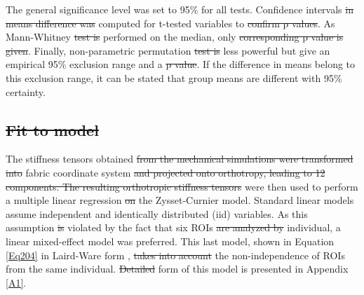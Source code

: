\documentclass[a4paper,fleqn]{DC_ArtStyle}
\providecommand{\DIFadd}[1]{{\protect\color{blue}{#1}}} %
\providecommand{\DIFdel}[1]{{\protect\color{red}\sout{#1}}}                      %
\providecommand{\DIFaddbegin}{} %
\providecommand{\DIFaddend}{} %
\providecommand{\DIFdelbegin}{} %
\providecommand{\DIFdelend}{} %
\begin{document}
\DIFdelend The general significance level was set to 95\% for all tests. Confidence intervals \DIFdelbegin \DIFdel{in means difference was }\DIFdelend \DIFaddbegin \DIFadd{were }\DIFaddend computed for t-tested variables to \DIFdelbegin \DIFdel{confirm p values}\DIFdelend \DIFaddbegin \DIFadd{quantify the difference in both groups means}\DIFaddend . As Mann-Whitney \DIFdelbegin \DIFdel{test is }\DIFdelend \DIFaddbegin \DIFadd{tests are }\DIFaddend performed on the median, only \DIFdelbegin \DIFdel{corresponding p value is given}\DIFdelend \DIFaddbegin \DIFadd{the corresponding p-value is presented}\DIFaddend . Finally, non-parametric permutation \DIFdelbegin \DIFdel{test is }\DIFdelend \DIFaddbegin \DIFadd{tests are }\DIFaddend less powerful but give an empirical 95\% exclusion range and a \DIFdelbegin \DIFdel{p value}\DIFdelend \DIFaddbegin \DIFadd{p-value}\DIFaddend . If the difference in means belong to this exclusion range, it can be stated that group means are different with 95\% certainty.

\subsection{\DIFdelbegin \DIFdel{Fit to model}\DIFdelend \DIFaddbegin \DIFadd{Linear Regression}\DIFaddend }
The \DIFaddbegin \DIFadd{orthotropic }\DIFaddend stiffness tensors obtained \DIFdelbegin \DIFdel{from the mechanical simulations were transformed into }\DIFdelend \DIFaddbegin \DIFadd{after transformation onto }\DIFaddend fabric coordinate system \DIFdelbegin \DIFdel{and projected onto orthotropy, leading to 12 components. The resulting orthotropic stiffness tensors }\DIFdelend were then used to perform a multiple linear regression \DIFdelbegin \DIFdel{on }\DIFdelend \DIFaddbegin \DIFadd{with }\DIFaddend the Zysset-Curnier model. Standard linear models assume independent and identically distributed (iid) variables. As this assumption \DIFdelbegin \DIFdel{is }\DIFdelend \DIFaddbegin \DIFadd{was }\DIFaddend violated by the fact that six ROIs \DIFdelbegin \DIFdel{are analyzed by }\DIFdelend \DIFaddbegin \DIFadd{were analyzed per }\DIFaddend individual, a linear mixed-effect model was preferred. This last model, shown in Equation \ref{Eq204} in Laird-Ware form \cite{Laird1982}, \DIFdelbegin \DIFdel{takes into account }\DIFdelend \DIFaddbegin \DIFadd{considered }\DIFaddend the non-independence of ROIs from the same individual. \DIFdelbegin \DIFdel{Detailed }\DIFdelend \DIFaddbegin \DIFadd{A more detailed }\DIFaddend form of this model is presented in Appendix \ref{A1}.
\end{document}
